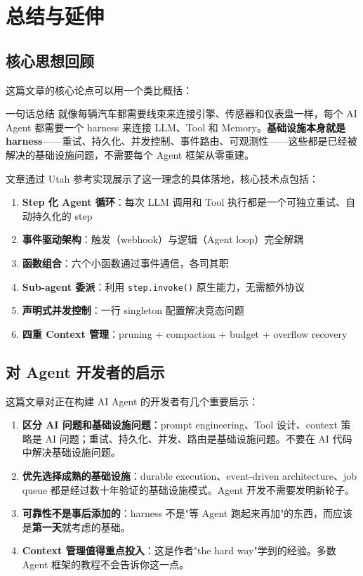 \section{总结与延伸}

\subsection{核心思想回顾}

这篇文章的核心论点可以用一个类比概括：

\begin{importantbox}{一句话总结}
就像每辆汽车都需要线束来连接引擎、传感器和仪表盘一样，每个 AI Agent 都需要一个 harness 来连接 LLM、Tool 和 Memory。\textbf{基础设施本身就是 harness}——重试、持久化、并发控制、事件路由、可观测性——这些都是已经被解决的基础设施问题，不需要每个 Agent 框架从零重建。
\end{importantbox}

文章通过 Utah 参考实现展示了这一理念的具体落地，核心技术点包括：

\begin{enumerate}
    \item \textbf{Step 化 Agent 循环}：每次 LLM 调用和 Tool 执行都是一个可独立重试、自动持久化的 step
    \item \textbf{事件驱动架构}：触发（webhook）与逻辑（Agent loop）完全解耦
    \item \textbf{函数组合}：六个小函数通过事件通信，各司其职
    \item \textbf{Sub-agent 委派}：利用 \texttt{step.invoke()} 原生能力，无需额外协议
    \item \textbf{声明式并发控制}：一行 singleton 配置解决竞态问题
    \item \textbf{四重 Context 管理}：pruning + compaction + budget + overflow recovery
\end{enumerate}

\subsection{对 Agent 开发者的启示}

这篇文章对正在构建 AI Agent 的开发者有几个重要启示：

\begin{enumerate}
    \item \textbf{区分 AI 问题和基础设施问题}：prompt engineering、Tool 设计、context 策略是 AI 问题；重试、持久化、并发、路由是基础设施问题。不要在 AI 代码中解决基础设施问题。
    \item \textbf{优先选择成熟的基础设施}：durable execution、event-driven architecture、job queue 都是经过数十年验证的基础设施模式。Agent 开发不需要发明新轮子。
    \item \textbf{可靠性不是事后添加的}：harness 不是"等 Agent 跑起来再加"的东西，而应该是\textbf{第一天}就考虑的基础。
    \item \textbf{Context 管理值得重点投入}：这是作者"the hard way"学到的经验。多数 Agent 框架的教程不会告诉你这一点。
\end{enumerate}

